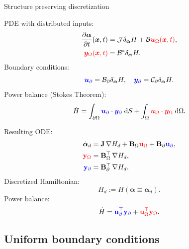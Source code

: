 \documentclass[aspectratio=169]{ISAE-Beamer}
\begin{document}
\begin{frame}{Structure preserving discretization}
	\begin{tcbraster}[raster columns=2, raster equal height]
		\begin{tcolorbox}[width=0.4\textwidth, nobeforeafter, colframe=theme,title=Infinite-dimensional pH system]%
			PDE with distributed inputs:
			\begin{align*}
				\diffp{\bm{\alpha}}{t}(\bm{x}, t) &= \mathcal{J} \delta_{\bm{\alpha}} H + \mathcal{B} \textcolor{red}{\bm{u}_\Omega(\bm{x}, t)}, \\
				\textcolor{red}{\bm{y}_\Omega(\bm{x}, t)} &= \mathcal{B}^* \delta_{\bm{\alpha}} H.
			\end{align*}
			Boundary conditions: 
			\[\textcolor{blue}{\bm{u}_\partial} = \mathcal{B}_\partial \delta_{\bm{\alpha}} H, \quad \textcolor{blue}{\bm{y}_\partial} = \mathcal{C}_\partial \delta_{\bm{\alpha}} H. \]
			Power balance (Stokes Theorem): 
			\[ \dot{H} = \displaystyle \int_{\partial \Omega} \textcolor{blue}{\bm{u}_\partial} \cdot \textcolor{blue}{\bm{y}_\partial} \d{S} +  \int_{\Omega} \textcolor{red}{\bm{u}_\Omega} \cdot \textcolor{red}{\bm{y}_\Omega} \d{\Omega}.
			\]
		\end{tcolorbox} 
		\begin{tcolorbox}[width=0.4\textwidth, nobeforeafter,  colframe=theme,title=Structure-preserving discretization]%
			Resulting ODE:
			\begin{align*}
				\dot{\bm{\alpha}}_d &= \mathbf{J} \, {\nabla {H}_d} + \mathbf{B}_\Omega \textcolor{red}{\mathbf{u}_\Omega} + \mathbf{B}_\partial \textcolor{blue}{\mathbf{u}_\partial}, \\
				\textcolor{red}{\mathbf{y}_\Omega} &= \mathbf{B}_\Omega^\top \, {\nabla {H}_d}, \\
				\textcolor{blue}{\mathbf{y}_\partial} &= \mathbf{B}_\partial^\top \,{\nabla {H}_d}.
			\end{align*}
			Discretized Hamiltonian:
			\[
			H_d := H(\bm{\alpha} \equiv \bm{\alpha}_d).
			\]
			Power balance: 
			\[ \dot{H} = \textcolor{blue}{\mathbf{u}_\partial^\top \mathbf{y}_\partial} +  \textcolor{red}{\mathbf{u}_\Omega^\top \mathbf{y}_\Omega}.
			\]
		\end{tcolorbox}
	\end{tcbraster}
\end{frame}

\subsection{Uniform boundary conditions}
\end{document}
